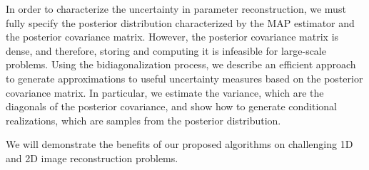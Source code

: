 \documentclass{report}
\begin{document}
In order to characterize the uncertainty in parameter reconstruction, we
must fully specify the posterior distribution characterized by the MAP
estimator and the posterior covariance matrix. However, the posterior
covariance matrix is dense, and therefore, storing and computing it is
infeasible for large-scale problems. Using the bidiagonalization process,
we describe an efficient approach to generate approximations to useful
uncertainty measures based on the posterior covariance matrix. In
particular, we estimate the variance, which are the diagonals of the
posterior covariance, and show how to generate conditional realizations,
which are samples from the posterior distribution.

We will demonstrate the benefits of our proposed algorithms on
challenging 1D and 2D image reconstruction problems.
\end{document}
